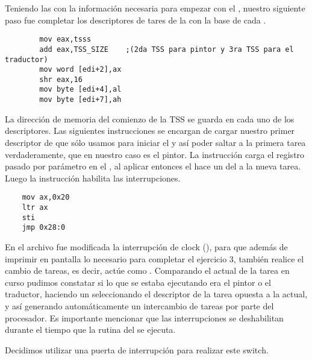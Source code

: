 	Teniendo las  con la información necesaria para empezar con el , nuestro siguiente paso fue completar los 
descriptores de tares de la  con la base de cada .

\begin{verbatim}
		mov eax,tsss 
		add eax,TSS_SIZE 	;(2da TSS para pintor y 3ra TSS para el traductor)
		mov word [edi+2],ax		
		shr eax,16 
		mov byte [edi+4],al 
		mov byte [edi+7],ah
\end{verbatim}

La dirección de memoria del comienzo de la TSS se guarda en cada uno de los descriptores. Las siguientes instrucciones se encargan de cargar nuestro 
primer descriptor de  que sólo usamos para iniciar el  y así poder saltar a la primera tarea verdaderamente, que en 
nuestro caso es el pintor. La instrucción  carga el registro pasado por parámetro en el , al aplicar entonces el 
 hace un  del  a la nueva tarea. Luego la instrucción  habilita las interrupciones. 

\begin{verbatim}	
	mov ax,0x20      	
	ltr ax 
	sti 
	jmp 0x28:0 
\end{verbatim}
	
En el archivo  fue modificada la interrupción de clock (), para que además de imprimir en pantalla lo necesario para completar 
el ejercicio 3, también realice el cambio de tareas, es decir, actúe como . Comparando el  actual de la tarea en curso pudimos 
constatar si lo que se estaba ejecutando era el pintor o el traductor, haciendo un  seleccionando el descriptor de la tarea opuesta a la 
actual, y así generando automáticamente un intercambio de tareas por parte del procesador. Es importante mencionar que las interrupciones se deshabilitan 
durante el tiempo que la rutina del  se ejecuta.

Decidimos utilizar una puerta de interrupción para realizar este switch.


